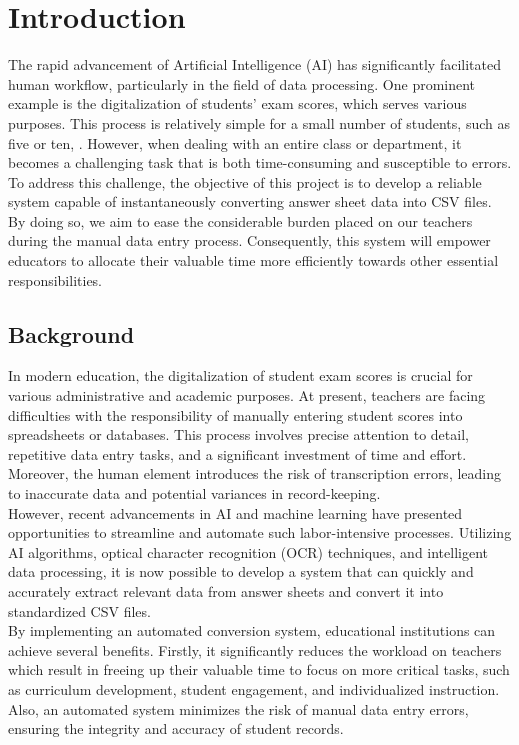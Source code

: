 \setcounter{equation}{0}
\chapter{Introduction}
The rapid advancement of Artificial Intelligence (AI) has significantly facilitated human workflow, particularly in the field of data processing. One prominent example is the digitalization of students' exam scores, which serves various purposes. This process is relatively simple for a small number of students, such as five or ten, . However, when dealing with an entire class or department, it becomes a challenging task that is both time-consuming and susceptible to errors.\\
To address this challenge, the objective of this project is to develop a reliable system capable of instantaneously converting answer sheet data into CSV files. By doing so, we aim to ease the considerable burden placed on our teachers during the manual data entry process. Consequently, this system will empower educators to allocate their valuable time more efficiently towards other essential responsibilities.

\setlength{\parskip}{2ex}

\section{Background}
\noindent In modern education, the digitalization of student exam scores is crucial for various administrative and academic purposes. At present, teachers are facing difficulties with the responsibility of manually entering student scores into spreadsheets or databases. This process involves precise attention to detail, repetitive data entry tasks, and a significant investment of time and effort. Moreover, the human element introduces the risk of transcription errors, leading to inaccurate data and potential variances in record-keeping.\\
However, recent advancements in AI and machine learning have presented opportunities to streamline and automate such labor-intensive processes. Utilizing AI algorithms, optical character recognition (OCR) techniques, and intelligent data processing, it is now possible to develop a system that can quickly and accurately extract relevant data from answer sheets and convert it into standardized CSV files.\\
By implementing an automated conversion system, educational institutions can achieve several benefits. Firstly, it significantly reduces the workload on teachers which result in freeing up their valuable time to focus on more critical tasks, such as curriculum development, student engagement, and individualized instruction. Also, an automated system minimizes the risk of manual data entry errors, ensuring the integrity and accuracy of student records.

